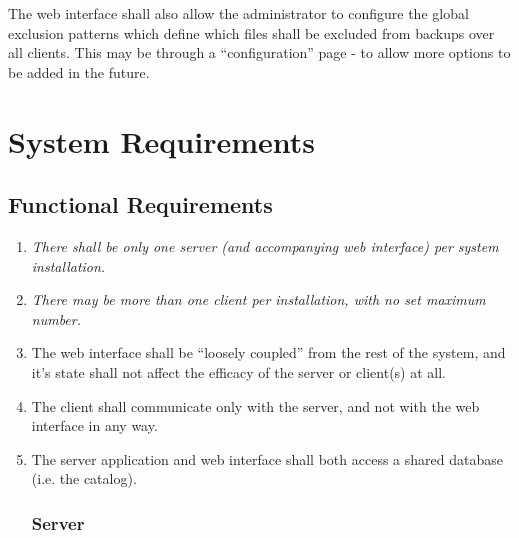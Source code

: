 The web interface shall also allow the administrator to configure the global
exclusion patterns which define which files shall be excluded from backups over
all clients. This may be through a ``configuration'' page - to allow more
options to be added in the future.


\section{System Requirements}

\subsection{Functional Requirements}

\begin{enumerate}

\renewcommand{\theenumi}{\arabic{enumi}}
\renewcommand{\labelenumi}{\textsc{FuncReq}$\theenumi$.}

\subsubsection{Architecture}

    \item \emph{There shall be only one server (and accompanying web interface)
        per system installation.}
    \item \emph{There may be more than one client per installation, with no set
        maximum number.}
    \item The web interface shall be ``loosely coupled'' from the rest of the
        system, and it's state shall not affect the efficacy of the server or
        client(s) at all.
    \item The client shall communicate only with the server, and not with the
        web interface in any way.
    \item The server application and web interface shall both access a shared
        database (i.e. the catalog).

\subsubsection{Server}


\end{enumerate}
